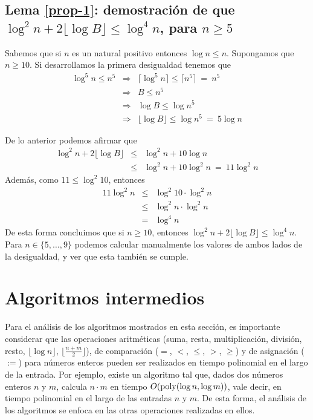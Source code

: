 \subsection{Lema \ref{prop-1}: demostración de que $\log^2 n + 2\lfloor \log B \rfloor \leq \log^4 n$, para $n\geq 5$}
\label{app-prop-1}
Sabemos que si $n$ es un natural positivo entonces $\log n \leq n$. Supongamos que $n\geq 10$. Si desarrollamos la primera desigualdad tenemos que 
\begin{eqnarray*}
\log^5 n \leq n^5 &\Rightarrow& \lceil\log^5 n\rceil \leq \lceil n^5\rceil \ = \ n^5\\
	&\Rightarrow& B \leq n^5\\
	&\Rightarrow& \log B  \leq \log {n^5}\\
	&\Rightarrow& \lfloor\log B\rfloor  \leq \log {n^5} \ = \ 5\log n	 
\end{eqnarray*}

De lo anterior podemos afirmar que
\begin{eqnarray*}
	\log^2 n + 2\lfloor \log B \rfloor
	&\leq& \log^2 n + 10\log n\\
	&\leq& \log^2 n + 10\log^2 n \ = \ 11\log^2 n
\end{eqnarray*}
Además, como $11\leq\log^2 10$, entonces
\begin{eqnarray*}
	11\log^2 n &\leq& \log^2 10 \cdot\log^2 n\\
	&\leq& \log^2n\cdot \log^2n\\
	&=& \log^4 n
\end{eqnarray*}
De esta forma concluimos que si $n\geq 10$, entonces $\log^2 n + 2\lfloor \log B \rfloor \leq \log^4 n$. Para $n\in \{5,\ldots, 9\}$ podemos calcular manualmente los valores de ambos lados de la desigualdad, y ver que esta también se cumple.


\section{Algoritmos intermedios}
\label{sec-app-alg-int}
Para el análisis de los algoritmos mostrados en esta sección, es importante considerar que las operaciones aritméticas (suma, resta, multiplicación, división, resto, $\lfloor \log n \rfloor$, $\lfloor \frac{n+m}{2} \rfloor$), de comparación ($=$, $<$, $\leq$, $>$, $\geq$) y de asignación ($:=$) para números enteros pueden ser realizados en tiempo polinomial en el largo de la entrada. Por ejemplo, existe un algoritmo tal que, dados dos números enteros $n$ y $m$, calcula $n\cdot m$ en tiempo $O({\rm poly}(\log n, \log m))$, vale decir, en tiempo polinomial en el largo de las entradas $n$ y $m$. De esta forma, el análisis de los algoritmos se enfoca en las otras operaciones realizadas en ellos.



